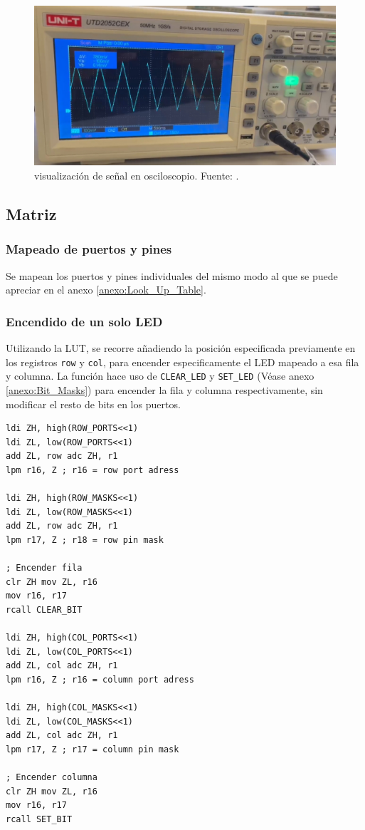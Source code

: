 \begin{figure}[H]
  \centering
  \includegraphics[width=\linewidth]{./Anexos/Resultados/DAC/Ocsiloscopio.jpg}
  \caption{visualización de señal en osciloscopio. Fuente: \cite{LabDrive}.}
  \label{fig:conversor_osciloscopio}
\end{figure}

\subsection{Matriz}

\subsubsection{Mapeado de puertos y pines}
Se mapean los puertos y pines individuales del mismo modo al que se puede apreciar en el anexo \ref{anexo:Look_Up_Table}. 

\subsubsection{Encendido de un solo LED}
Utilizando la LUT, se recorre añadiendo la posición especificada previamente en los registros \texttt{row} y \texttt{col}, para encender especificamente el LED mapeado a esa fila y columna. La función hace uso de \texttt{CLEAR\_LED} y \texttt{SET\_LED} (Véase anexo \ref{anexo:Bit_Masks}) para encender la fila y columna respectivamente, sin modificar el resto de bits en los puertos. 

\begin{verbatim}
ldi ZH, high(ROW_PORTS<<1) 
ldi ZL, low(ROW_PORTS<<1)
add ZL, row adc ZH, r1  
lpm r16, Z ; r16 = row port adress
        
ldi ZH, high(ROW_MASKS<<1) 
ldi ZL, low(ROW_MASKS<<1)
add ZL, row adc ZH, r1
lpm r17, Z ; r18 = row pin mask

; Encender fila
clr ZH mov ZL, r16 
mov r16, r17
rcall CLEAR_BIT

ldi ZH, high(COL_PORTS<<1) 
ldi ZL, low(COL_PORTS<<1)  
add ZL, col adc ZH, r1  
lpm r16, Z ; r16 = column port adress

ldi ZH, high(COL_MASKS<<1) 
ldi ZL, low(COL_MASKS<<1)  
add ZL, col adc ZH, r1  
lpm r17, Z ; r17 = column pin mask

; Encender columna
clr ZH mov ZL, r16 
mov r16, r17
rcall SET_BIT
\end{verbatim}

